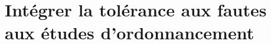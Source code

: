 \chapter{Intégrer la tolérance aux fautes aux études d'ordonnancement}
\label{chap:contribution_tf_ordo}
\minitoc












